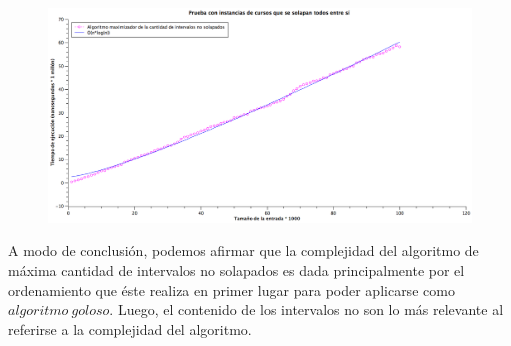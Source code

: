 \begin{figure}[H] %
\begin{center}
\includegraphics[width=460pt]{../imgs/graficoej2_solapados.png}
\end{center}
\end{figure}

A modo de conclusión, podemos afirmar que la complejidad del algoritmo de máxima cantidad de intervalos no solapados es dada principalmente por el ordenamiento que éste realiza en primer lugar para poder aplicarse como $algoritmo\ goloso$. Luego, el contenido de los intervalos no son lo más relevante al referirse a la complejidad del algoritmo.